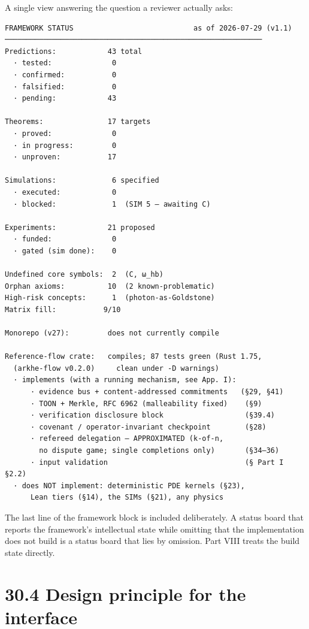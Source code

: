 \documentclass[
  11pt]{report}
\begin{document}
A single view answering the question a reviewer actually asks:

\begin{verbatim}
FRAMEWORK STATUS                            as of 2026-07-29 (v1.1)
────────────────────────────────────────────────────────────
Predictions:            43 total
  · tested:              0
  · confirmed:           0
  · falsified:           0
  · pending:            43

Theorems:               17 targets
  · proved:              0
  · in progress:         0
  · unproven:           17

Simulations:             6 specified
  · executed:            0
  · blocked:             1  (SIM 5 — awaiting C)

Experiments:            21 proposed
  · funded:              0
  · gated (sim done):    0

Undefined core symbols:  2  (C, ω_hb)
Orphan axioms:          10  (2 known-problematic)
High-risk concepts:      1  (photon-as-Goldstone)
Matrix fill:           9/10

Monorepo (v27):         does not currently compile

Reference-flow crate:   compiles; 87 tests green (Rust 1.75,
  (arkhe-flow v0.2.0)     clean under -D warnings)
  · implements (with a running mechanism, see App. I):
      · evidence bus + content-addressed commitments   (§29, §41)
      · TOON + Merkle, RFC 6962 (malleability fixed)    (§9)
      · verification disclosure block                   (§39.4)
      · covenant / operator-invariant checkpoint        (§28)
      · refereed delegation — APPROXIMATED (k-of-n,
        no dispute game; single completions only)       (§34–36)
      · input validation                                (§ Part I §2.2)
  · does NOT implement: deterministic PDE kernels (§23),
      Lean tiers (§14), the SIMs (§21), any physics
\end{verbatim}

The last line of the framework block is included deliberately. A status
board that reports the framework's intellectual state while omitting
that the implementation does not build is a status board that lies by
omission. Part VIII treats the build state directly.

\hypertarget{design-principle-for-the-interface}{%
\section{30.4 Design principle for the
interface}\label{design-principle-for-the-interface}}
\end{document}
